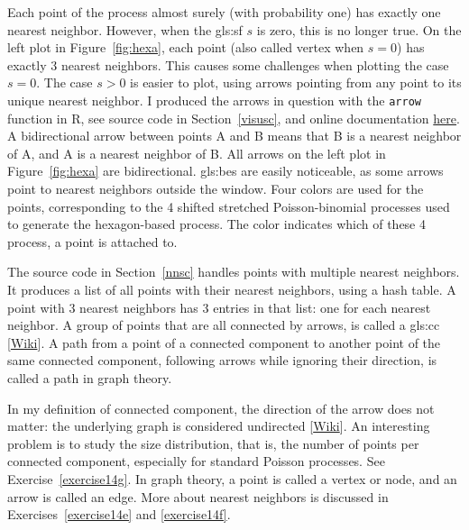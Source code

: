 \documentclass[10pt]{article}
\begin{document}
Each point of the process almost surely (with probability one) has exactly one nearest neighbor. However, when the 
\gls{gls:sf} $s$ is zero, this is no longer true. On the left plot in Figure~\ref{fig:hexa}, each point (also called  
\textcolor{index}{vertex} when $s=0$) has exactly 3 nearest neighbors. This causes some challenges when plotting the case $s=0$. The case $s>0$ is easier to plot, using arrows pointing from any point to its unique nearest neighbor. 
I produced the arrows in question with the \texttt{arrow} function in R, see source code in Section~\ref{visusc}, and online 
documentation \href{https://stat.ethz.ch/R-manual/R-devel/library/graphics/html/arrows.html}{here}.
A bidirectional arrow between points A and B means that B is a nearest neighbor of A, and A is a nearest neighbor of B. All arrows on the left plot in 
Figure~\ref{fig:hexa} are bidirectional.  \Glspl{gls:be} are easily noticeable, as some arrows point to nearest neighbors outside the window. 
Four colors are used for the points, corresponding to the  4 shifted stretched Poisson-binomial processes used to generate the hexagon-based process. The color indicates which of these 4 process, a point is attached to.

The source code in Section~\ref{nnsc} handles points with multiple nearest neighbors. It produces a list of all points with their nearest neighbors, using a 
\textcolor{index}{hash table}. A point with 3 nearest neighbors has 3 entries in that list: one for each nearest neighbor. A group of points that are all connected by arrows, is called a \gls{gls:cc} [\href{https://en.wikipedia.org/wiki/Component_(graph_theory)}{Wiki}]. A path from a point of a connected component to another point of the same connected component, following arrows while ignoring their direction, is called a 
\textcolor{index}{path} in \textcolor{index}{graph theory}.


In my definition of connected component, the direction of the arrow does not matter: the underlying 
\textcolor{index}{graph} is considered \textcolor{index}{undirected}
[\href{https://en.wikipedia.org/wiki/Directed_graph}{Wiki}]. An interesting problem is to study the size distribution, that is, the number of points 
per connected component, especially for standard Poisson processes. See Exercise~\ref{exercise14g}. In graph theory, a point is called
a \textcolor{index}{vertex} or 
\textcolor{index}{node}, and an arrow is called an \textcolor{index}{edge}. More about nearest neighbors is
discussed in Exercises~\ref{exercise14e} and \ref{exercise14f}.
\end{document}
